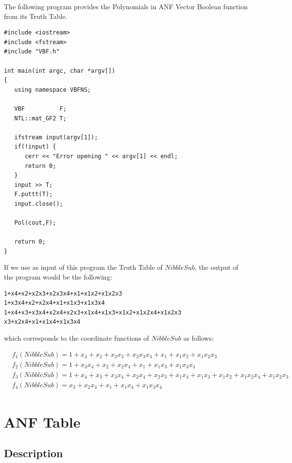 \begin{example}
The following program provides the Polynomials in ANF Vector Boolean function from its Truth Table. 

\begin{verbatim}
#include <iostream>
#include <fstream>
#include "VBF.h"

int main(int argc, char *argv[])
{
   using namespace VBFNS;

   VBF          F;
   NTL::mat_GF2 T;
 
   ifstream input(argv[1]);
   if(!input) {
      cerr << "Error opening " << argv[1] << endl;
      return 0;
   }
   input >> T;
   F.puttt(T);
   input.close();

   Pol(cout,F);

   return 0;
}
\end{verbatim}

If we use as input of this program the Truth Table of $NibbleSub$, the output of the program would be the following:

\begin{verbatim}
1+x4+x2+x2x3+x2x3x4+x1+x1x2+x1x2x3
1+x3x4+x2+x2x4+x1+x1x3+x1x3x4
1+x4+x3+x3x4+x2x4+x2x3+x1x4+x1x3+x1x2+x1x2x4+x1x2x3
x3+x2x4+x1+x1x4+x1x3x4
\end{verbatim}

which corresponds to the coordinate functions of $NibbleSub$ as follows:

\begin{equation}
\begin{array}{ll}
&f_1(NibbleSub) = 1+x_4+x_2+x_2x_3+x_2x_3x_4+x_1+x_1x_2+x_1x_2x_3 \\
&f_2(NibbleSub) = 1+x_3x_4+x_2+x_2x_4+x_1+x_1x_3+x_1x_3x_4 \\
&f_3(NibbleSub) = 1+x_4+x_3+x_3x_4+x_2x_4+x_2x_3+x_1x_4+x_1x_3+x_1x_2+x_1x_2x_4+x_1x_2x_3 \\
&f_4(NibbleSub) = x_3+x_2x_4+x_1+x_1x_4+x_1x_3x_4 \\
\end{array}
\end{equation}

\end{example}

\section{ANF Table}
\label{sec:ANF}

\subsection{Description}


